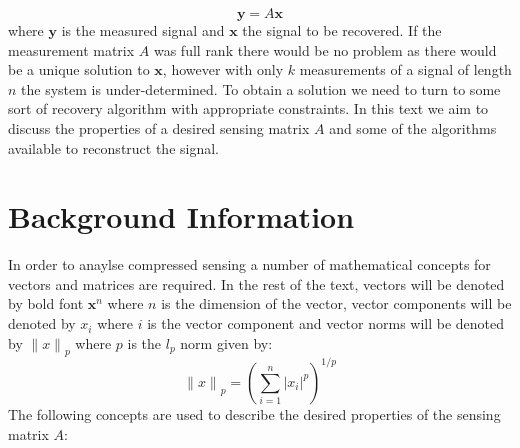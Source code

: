 \documentclass[11pt,twoside,a4paper]{article}
\begin{document}
\begin{equation}
\mathbf{y}=A\mathbf{x}
\end{equation}
where $\mathbf{y}$ is the measured signal and $\mathbf{x}$ the signal to be recovered. If the measurement matrix $A$ was full rank there would be no problem as there would be a unique solution to $\mathbf{x}$, however with only $k$ measurements of a signal of length $n$ the system is under-determined. To obtain a solution we need to turn to some sort of recovery algorithm with appropriate constraints. In this text we aim to discuss the properties of a desired sensing matrix $A$ and some of the algorithms available to reconstruct the signal.

\section{Background Information}\label{sec: background}
In order to anaylse compressed sensing a number of mathematical concepts for vectors and matrices are required. In the rest of the text, vectors will be denoted by bold font $\mathbf{x}^n$ where $n$ is the dimension of the vector, vector components will be denoted by $x_i$ where $i$ is the vector component and vector  norms will be denoted by ${\lVert x \rVert}_p$ where $p$ is the $l_p$ norm given by:
	\begin{equation}
		{\lVert x \rVert}_p=\left (\sum_{i=1}^n{{\lvert x_i\rvert}^p}\right )^{1/p}
	\end{equation}
The following concepts are used to describe the desired properties of the sensing matrix $A$:\\
\end{document}
